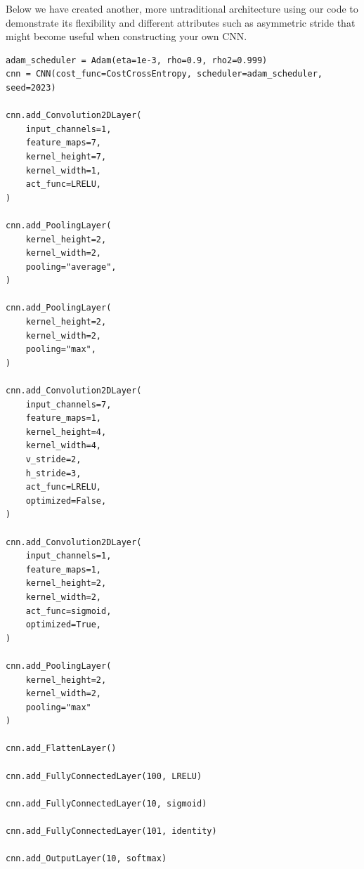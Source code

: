\documentclass[%
oneside,                 %
final,                   %
10pt]{article}
\begin{document}
Below we have created another, more untraditional architecture using
our code to demonstrate its flexibility and different attributes such
as asymmetric stride that might become useful when constructing your
own CNN.




























































\begin{verbatim}
adam_scheduler = Adam(eta=1e-3, rho=0.9, rho2=0.999)
cnn = CNN(cost_func=CostCrossEntropy, scheduler=adam_scheduler, seed=2023)

cnn.add_Convolution2DLayer(
    input_channels=1,
    feature_maps=7,
    kernel_height=7,
    kernel_width=1,
    act_func=LRELU,
)

cnn.add_PoolingLayer(
    kernel_height=2,
    kernel_width=2,
    pooling="average",
)

cnn.add_PoolingLayer(
    kernel_height=2,
    kernel_width=2,
    pooling="max",
)

cnn.add_Convolution2DLayer(
    input_channels=7,
    feature_maps=1,
    kernel_height=4,
    kernel_width=4,
    v_stride=2,
    h_stride=3,
    act_func=LRELU,
    optimized=False,
)

cnn.add_Convolution2DLayer(
    input_channels=1,
    feature_maps=1,
    kernel_height=2,
    kernel_width=2,
    act_func=sigmoid,
    optimized=True,
)

cnn.add_PoolingLayer(
    kernel_height=2,
    kernel_width=2,
    pooling="max"
)

cnn.add_FlattenLayer()

cnn.add_FullyConnectedLayer(100, LRELU)

cnn.add_FullyConnectedLayer(10, sigmoid)

cnn.add_FullyConnectedLayer(101, identity)

cnn.add_OutputLayer(10, softmax)

\end{verbatim}
\end{document}

